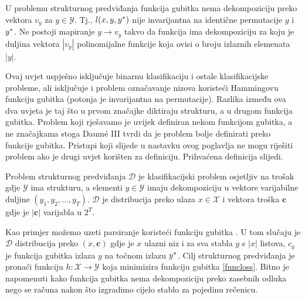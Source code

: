 \begin{condition}

  U problemu strukturnog predviđanja funkcija gubitka nema dekompoziciju preko
  vektora $v_y$ za $y \in \mathcal{Y}$. Tj., $l(x, y, y\ssymbol{1})$ nije
  invarijantna na identične permutacije $y$ i $y\ssymbol{1}$. Ne postoji
  mapiranje $y \to v_y$ takvo da funkcija ima dekompoziciju za koju je duljina
  vektora $|v_y|$ polinomijalne funkcije koja ovisi o broju izlaznih elemenata
  $|y|$.

\end{condition}

Ovaj uvjet uspješno isključuje binarnu klasifikaciju i ostale klasifikacijske
probleme, ali isključuje i problem označavanje nizova koristeći Hammingovu
funkciju gubitka (potonja je invarijantna na permutacije). Razlika između ova
dva uvjeta je taj što u prvom značajke diktiraju strukturu, a u drugom funkcija
gubitka. Problem koji rješavamo je uvijek definiran nekom funkcijom gubitka, a
ne značajkama stoga Daum\'e III tvrdi da je problem bolje definirati preko
funkcije gubitka. Pristupi koji slijede u nastavku ovog poglavlja ne mogu
riješiti problem ako je drugi uvjet korišten za definiciju. Prihvaćena
definicija slijedi.

\begin{definition} \label{jointlearndef}

  Problem strukturnog predviđanja $\mathcal{D}$ je klasifikacijski problem
  osjetljiv na trošak  gdje
  $\mathcal{Y}$ ima strukturu, a elementi $y \in \mathcal{Y}$ imaju
  dekompoziciju u vektore varijabilne duljine $(y_1, y_2, \ldots, y_T)$.
  $\mathcal{D}$ je distribucija preko ulaza $x \in \mathcal{X}$ i vektora troška
  $\mathbf{c}$ gdje je $|\mathbf{c}|$ varijabla u $2^T$.

\end{definition}

Kao primjer možemo uzeti parsiranje koristeći funkciju gubitka
. U tom slučaju je $\mathcal{D}$ distribucija preko $(x,
\mathbf{c})$ gdje je $x$ ulazni niz i za sva stabla $y$ s $|x|$ listova, $c_y$
je funkcija gubitka  izlaza $y$ na točnom izlazu
$y\ssymbol{1}$. Cilj strukturnog predviđanja je pronaći funkciju $h: \mathcal{X}
\rightarrow \mathcal{Y}$ koja minimizira funkciju gubitka \ref{funcloss}. Bitno
je napomenuti kako funkcija gubitka  nema dekompoziciju
preko zasebnih odluka nego se računa nakon što izgradimo cijelo stablo za
pojedinu rečenicu.


